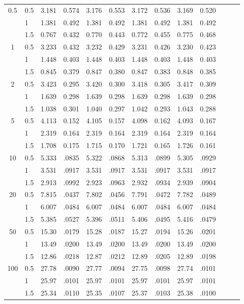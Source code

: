 \begin{table}[pt]
\begin{tabular}{clccclccccccc}
		0.5 & 0.5 & 3.181 & 0.574 & 3.176 & 0.553 & 3.172 & 0.536 & 3.169 & 0.520 \\ 
		& 1 & 1.381 & 0.492 & 1.381 & 0.492 & 1.381 & 0.492 & 1.381 & 0.492 \\ 
		& 1.5 & 0.767 & 0.432 & 0.770 & 0.443 & 0.772 & 0.455 & 0.775 & 0.468 \\ 
		1 & 0.5 & 3.233 & 0.432 & 3.232 & 0.429 & 3.231 & 0.426 & 3.230 & 0.423 \\ 
		& 1 & 1.448 & 0.403 & 1.448 & 0.403 & 1.448 & 0.403 & 1.448 & 0.403 \\ 
		& 1.5 & 0.845 & 0.379 & 0.847 & 0.380 & 0.847 & 0.383 & 0.848 & 0.385 \\ 
		2 & 0.5 & 3.423 & 0.295 & 3.420 & 0.300 & 3.418 & 0.305 & 3.417 & 0.309 \\ 
		& 1 & 1.639 & 0.298 & 1.639 & 0.298 & 1.639 & 0.298 & 1.639 & 0.298 \\ 
		& 1.5 & 1.038 & 0.301 & 1.040 & 0.297 & 1.042 & 0.293 & 1.043 & 0.288  \\ 
		5 & 0.5 & 4.113 & 0.152 & 4.105 & 0.157 & 4.098 & 0.162 & 4.093 & 0.167 \\ 
		& 1 & 2.319 & 0.164 & 2.319 & 0.164 & 2.319 & 0.164 & 2.319 & 0.164 \\ 
		& 1.5 & 1.708 & 0.175 & 1.715 & 0.170 & 1.721 & 0.165 & 1.726 & 0.161  \\ 
		10 & 0.5 & 5.333 & .0835 & 5.322 & .0868 & 5.313 & .0899 & 5.305 & .0929  \\ 
		& 1 & 3.531 & .0917 & 3.531 & .0917 & 3.531 & .0917 & 3.531 & .0917 \\ 
		& 1.5 & 2.913 & .0992 & 2.923 & .0963 & 2.932 & .0934 & 2.939 & .0904 \\ 
		20 & 0.5 & 7.815 & .0437 & 7.802 & .0456 & 7.791 & .0472 & 7.782 & .0489 \\ 
		& 1 & 6.007 & .0484 & 6.007 & .0484 & 6.007 & .0484 & 6.007 & .0484	\\ 
		& 1.5 & 5.385 & .0527 & 5.396 & .0511 & 5.406 & .0495 & 5.416 & .0479  \\ 
		50 & 0.5 & 15.30 & .0179 & 15.28 & .0187 & 15.27 & .0194 & 15.26 & .0201  \\ 
		& 1 & 13.49 & .0200 & 13.49 & .0200 & 13.49 & .0200 & 13.49 & .0200 
		\\ 
		& 1.5 & 12.86 & .0218 & 12.87 & .0212 & 12.89 & .0205 & 12.89 & .0198  \\ 
		100 & 0.5 & 27.78 & .0090 & 27.77 & .0094 & 27.75 & .0098 & 27.74 & .0101   \\ 
		& 1 & 25.97 & .0101 & 25.97 & .0101 & 25.97 & .0101 & 25.97 & .0101 
		\\ 
		& 1.5 & 25.34 & .0110 & 25.35 & .0107 & 25.37 & .0103 & 25.38 & .0100  \\
		\hline
	\end{tabular}%
	\label{table_poiseuille_tube_compare}
\end{table}


